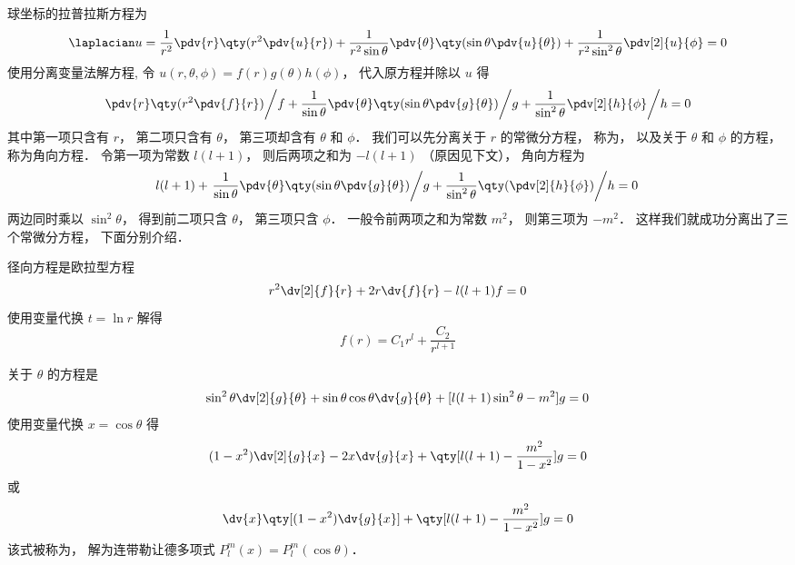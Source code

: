 

球坐标的拉普拉斯方程为
\begin{equation}
\laplacian u = \frac{1}{r^2} \pdv{r} \qty(r^2 \pdv{u}{r}) + \frac{1}{r^2 \sin\theta}\pdv{\theta} \qty(\sin \theta \pdv{u}{\theta}) + \frac{1}{r^2 \sin^2 \theta} \pdv[2]{u}{\phi} = 0
\end{equation}
使用分离变量法解方程, 令 $u(r, \theta, \phi) = f(r)g(\theta)h(\phi)$， 代入原方程并除以 $u$ 得
\begin{equation}
\left. \pdv{r} \qty(r^2 \pdv{f}{r}) \middle/ f + \frac{1}{\sin\theta}\pdv{\theta} \qty(\sin \theta \pdv{g}{\theta}) \middle/ g + \frac{1}{\sin^2 \theta} \pdv[2]{h}{\phi} \middle/ h = 0 \right.
\end{equation}
其中第一项只含有 $r$， 第二项只含有 $\theta$， 第三项却含有 $\theta$ 和 $\phi$． 我们可以先分离关于 $r$ 的常微分方程， 称为， 以及关于 $\theta$ 和 $\phi$ 的方程， 称为角向方程． 令第一项为常数 $l(l+1)$， 则后两项之和为 $-l(l+1)$ （原因见下文）， 角向方程为
\begin{equation}\label{SphLap_eq3}
l(l+1) + \left. \frac{1}{\sin\theta}\pdv{\theta} \qty(\sin \theta \pdv{g}{\theta}) \middle/ g + \frac{1}{\sin^2 \theta} \qty(\pdv[2]{h}{\phi}) \middle/ h = 0 \right.
\end{equation}
两边同时乘以 $\sin^2\theta$， 得到前二项只含 $\theta$， 第三项只含 $\phi$． 一般令前两项之和为常数 $m^2$， 则第三项为 $-m^2$． 这样我们就成功分离出了三个常微分方程， 下面分别介绍．

径向方程是欧拉型方程%
\begin{equation}
r^2\dv[2]{f}{r} + 2r\dv{f}{r} - l(l+1)f = 0
\end{equation}
使用变量代换 $t = \ln r$ 解得
\begin{equation}
f(r) = C_1 r^l + \frac{C_2}{r^{l+1}}
\end{equation}

关于 $\theta$ 的方程是
\begin{equation}
\sin^2\theta \dv[2]{g}{\theta} + \sin\theta\cos\theta\dv{g}{\theta} + [l(l+1)\sin^2\theta - m^2] g = 0
\end{equation}
使用变量代换 $x = \cos\theta$ 得
\begin{equation}
(1-x^2)\dv[2]{g}{x} - 2x\dv{g}{x} + \qty[l(l+1) - \frac{m^2}{1-x^2}]g = 0
\end{equation}
或
\begin{equation}
\dv{x} \qty[(1-x^2)\dv{g}{x}] + \qty[l(l+1) - \frac{m^2}{1-x^2}]g = 0
\end{equation}
该式被称为， 解为连带勒让德多项式 $P_l^m(x) = P_l^m(\cos\theta)$．


